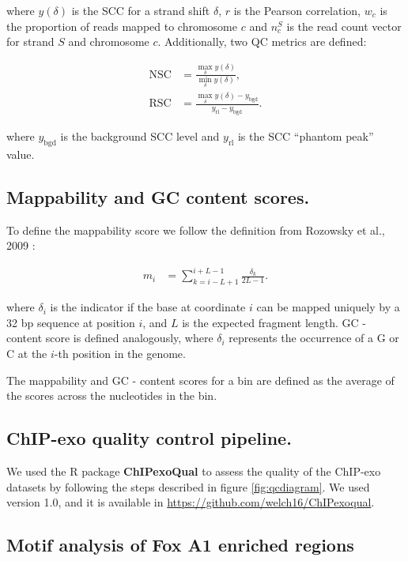 \documentclass{bmcart}\usepackage[]{graphicx}\usepackage[]{color}
\begin{document}
where $y(\delta)$ is the SCC for a strand shift $\delta$, $r$ is the
Pearson correlation, $w_c$ is the proportion of reads mapped to
chromosome $c$ and $n_c^S$ is the read count vector for strand $S$ and
chromosome $c$. Additionally, two QC metrics are defined:

\begin{align}
  \mbox{NSC} &= \frac{\max_\delta y(\delta)}{\min_\delta y(\delta)}, \label{nsc} \\
  \mbox{RSC} &= \frac{\max_\delta y(\delta) -
    y_{\text{bgd}}}{y_{\text{rl}} - y_{\text{bgd}}}. \label{rsc}
\end{align}

where $y_{\text{bgd}}$ is the background SCC level and $y_{\text{rl}}$
is the SCC ``phantom peak'' value.

\subsection*{Mappability and GC content scores.}

To define the mappability score we follow the definition from Rozowsky
et al., 2009 \cite{peakseq}:

\begin{align}
  m_i &= \sum_{k = i - L +1}^{i + L - 1} \frac{\delta_k }{2L - 1}.
\end{align}

where $\delta_i$ is the indicator if the base at coordinate $i$ can be
mapped uniquely by a 32 bp sequence at position $i$, and $L$ is the
expected fragment length. GC - content score is defined analogously,
where $\delta_i$ represents the occurrence of a G or C at the $i$-th
position in the genome. 

The mappability and GC - content scores for a bin are defined as the
average of the scores across the nucleotides in the bin.

\subsection*{ChIP-exo quality control pipeline.}

We used the R package \textbf{ChIPexoQual} to assess the quality of
the ChIP-exo datasets by following the steps described in figure
\ref{fig:qcdiagram}. We used version 1.0, and it is available in
\url{https://github.com/welch16/ChIPexoqual}.

\subsection*{Motif analysis of Fox A1 enriched regions}
\end{document}
